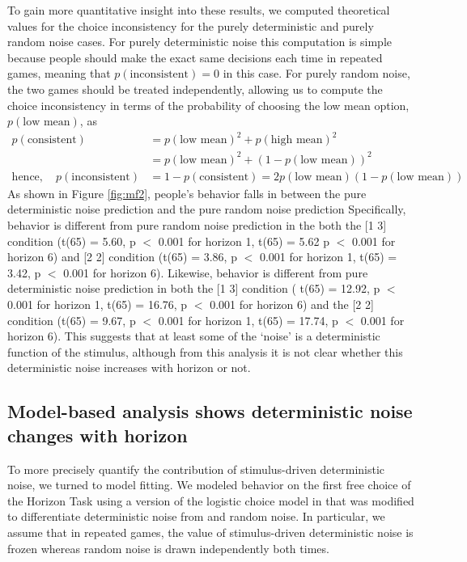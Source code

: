 \documentclass[12pt]{article}
\begin{document}
	To gain more quantitative insight into these results, we computed theoretical values for the choice inconsistency for the purely deterministic and purely random noise cases.  For purely deterministic noise this computation is simple because people should make the exact same decisions each time in repeated games, meaning that $p(\mbox{inconsistent}) = 0$ in this case. For purely random noise, the two games should be treated independently, allowing us to compute the choice inconsistency in terms of the probability of choosing the low mean option, $p(\mbox{low mean})$, as
	\begin{equation*}
	\begin{split}
	p(\mbox{consistent}) &= p(\mbox{low mean})^2 + p(\mbox{high mean})^2\\
	&= p(\mbox{low mean})^2 + (1-p(\mbox{low mean}))^2\\ 
	\mbox{hence},\quad p(\mbox{inconsistent}) &=  
	1 - p(\mbox{consistent}) = 
	2 p(\mbox{low mean})(1-p(\mbox{low mean}))
	\end{split}
	\end{equation*}
	As shown in Figure  \ref{fig:mf2}, people's behavior falls in between the pure deterministic noise prediction and the pure random noise prediction Specifically, behavior is different from pure random noise prediction in the both the [1 3] condition (t(65) = 5.60, p $<$ 0.001 for horizon 1, t(65) = 5.62 p $<$ 0.001 for horizon 6) and [2 2] condition (t(65) = 3.86, p $<$ 0.001 for horizon 1, t(65) = 3.42, p $<$ 0.001 for horizon 6). Likewise, behavior is different from pure deterministic noise prediction in both the [1 3] condition ( t(65) = 12.92, p $<$ 0.001 for horizon 1, t(65) = 16.76, p $<$ 0.001 for horizon 6) and the [2 2] condition (t(65) = 9.67, p $<$ 0.001 for horizon 1, t(65) = 17.74, p $<$ 0.001 for horizon 6). This suggests that at least some of the `noise' is a deterministic function of the stimulus, although from this analysis it is not clear whether this deterministic noise increases with horizon or not.
	
	\subsection*{Model-based analysis shows deterministic noise changes with horizon}
	
	To more precisely quantify the contribution of stimulus-driven deterministic noise, we turned to model fitting. We modeled behavior on the first free choice of the Horizon Task using a version of the logistic choice model in \citep{wilson2014} that was modified to differentiate deterministic noise from and random noise. In particular, we assume that in repeated games, the value of stimulus-driven deterministic noise is frozen whereas random noise is drawn independently both times. 
	
\end{document}
